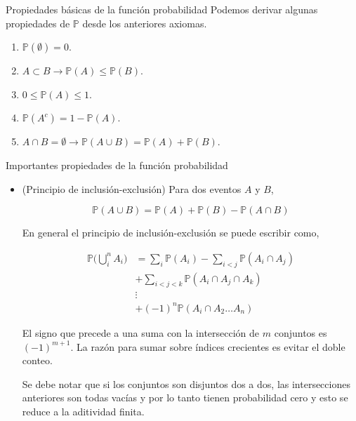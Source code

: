 \documentclass{beamer}
\begin{document}
\begin{frame}{Propiedades b\'asicas de la funci\'on  probabilidad}
Podemos derivar algunas propiedades de $\mathbb{P}$ desde los anteriores axiomas. 

\begin{enumerate}
	\item $\mathbb{P}(\emptyset ) = 0$.
	\item $A \subset B \rightarrow \mathbb{P}(A) \leq \mathbb{P}(B)$.
	\item $0 \leq \mathbb{P}(A) \leq 1$.
	\item $ \mathbb{P}(A^c) = 1-\mathbb{P}(A)$.
	\item $A \cap B = \emptyset \rightarrow  \mathbb{P}(A \cup B) = \mathbb{P}(A) + \mathbb{P}(B)$.
\end{enumerate}	


\end{frame}

\begin{frame}{Importantes propiedades de la funci\'on  probabilidad}

\begin{itemize}
\item \scriptsize{(Principio de inclusi\'on-exclusi\'on) Para dos eventos $A$ y $B$,
	
	\[
	\mathbb{P}(A\cup B) = \mathbb{P}(A) + \mathbb{P}(B) -\mathbb{P}(A \cap B)
	\]
	

En general el principio de inclusi\'on-exclusi\'on  se puede escribir como,

\vspace{0.2cm}

\begin{align*}
\mathbb{P}\Biggl(\bigcup_{i}^{n} A_i\Biggr) & = \sum_{i}\mathbb{P}(A_i) -\sum_{i < j}\mathbb{P}(A_i \cap A_j)\\
&  + \sum_{i < j < k}\mathbb{P}(A_i \cap A_j \cap A_k)\\
&  \vdots \\
& + (-1)^n\mathbb{P}(A_i \cap A_2 \dots A_n)
\end{align*}

El signo que precede a una suma con la intersecci\'on de $m$ conjuntos es $(-1)^{m + 1}$. La raz\'on para sumar sobre \'indices crecientes es evitar el doble conteo.

\vspace{0.2cm}

Se debe notar  que si los conjuntos son disjuntos dos a dos, las intersecciones anteriores son todas vac\'ias y por lo tanto tienen probabilidad cero y esto se reduce a la aditividad finita.}
\end{itemize}
\end{frame}
\end{document}
